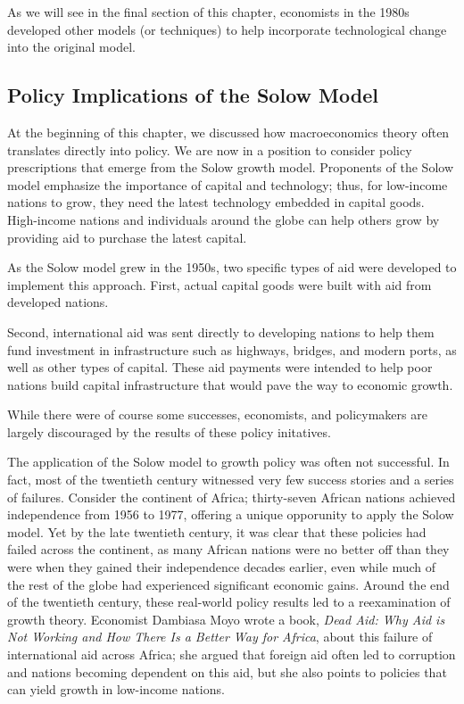 \documentclass[11pt]{article} %
\begin{document}
As we will see in the final section of this chapter, economists in the 1980s developed other models (or techniques) to help incorporate technological change into the original model.

\subsection*{Policy Implications of the Solow Model}
At the beginning of this chapter, we discussed how macroeconomics theory often translates directly into policy. We are now in a position to consider policy prescriptions that emerge from the Solow growth model. Proponents of the Solow model emphasize the importance of capital and technology; thus, for low-income nations to grow, they need the latest technology embedded in capital goods. High-income nations and individuals around the globe can help others grow by providing aid to purchase the latest capital.

As the Solow model grew in the 1950s, two specific types of aid were developed to implement this approach. First, actual capital goods were built with aid from developed nations.

Second, international aid was sent directly to developing nations to help them fund investment in infrastructure such as highways, bridges, and modern ports, as well as other types of capital. These aid payments were intended to help poor nations build capital infrastructure that would pave the way to economic growth.

While there were of course some successes, economists, and policymakers are largely discouraged by the results of these policy initatives.

The application of the Solow model to growth policy was often not successful. In fact, most of the twentieth century witnessed very few success stories and a series of failures. Consider the continent of Africa; thirty-seven African nations achieved independence from 1956 to 1977, offering a unique opporunity to apply the Solow model. Yet by the late twentieth century, it was clear that these policies had failed across the continent, as many African nations were no better off than they were when they gained their independence decades earlier, even while much of the rest of the globe had experienced significant economic gains. Around the end of the twentieth century, these real-world policy results led to a reexamination of growth theory. Economist Dambiasa Moyo wrote a book, \textit{Dead Aid: Why Aid is Not Working and How There Is a Better Way for Africa}, about this failure of international aid across Africa; she argued that foreign aid often led to corruption and nations becoming dependent on this aid, but she also points to policies that can yield growth in low-income nations.
\end{document}
